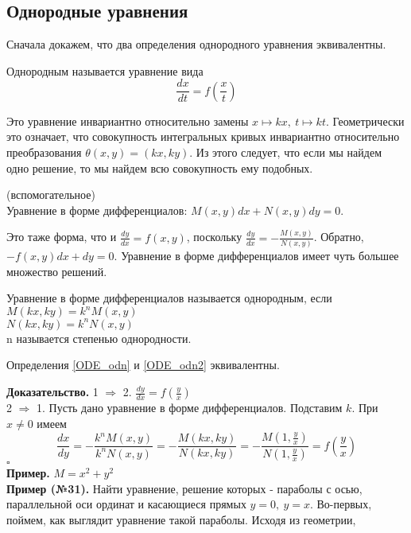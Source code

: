 \subsection{Однородные уравнения}
Сначала докажем, что два определения однородного уравнения эквивалентны.
\begin{defin}\label{ODE_odn}
Однородным называется уравнение вида
\begin{equation}%
    \frac{dx}{dt}=f\left(\frac{x}{t}\right) 
\end{equation} 
\end{defin}
Это уравнение инвариантно относительно замены $x\mapsto kx,~t\mapsto kt$.
Геометрически это означает, что совокупность интегральных кривых инвариантно
относительно преобразования $\theta(x,y)=(kx,ky)$.
Из этого следует, что если мы найдем одно решение, то мы найдем всю 
совокупность ему подобных. %
\begin{defin}
    (вспомогательное)\\
Уравнение в форме дифференциалов:
    $M(x,y)dx+N(x,y)dy=0$.  
\end{defin}
Это таже форма, что и $\frac{dy}{dx}=f(x,y)$, поскольку 
$\frac{dy}{dx}=-\frac{M(x,y)}{N(x,y)}$. Обратно, $-f(x,y)dx+dy=0$.
Уравнение в форме дифференциалов имеет чуть большее множество решений. 
\begin{defin}\label{ODE_odn2}
Уравнение в форме дифференциалов называется однородным, если\\
$M(kx,ky)=k^nM(x,y)$\\ 
$N(kx,ky)=k^nN(x,y)$\\
n называется степенью однородности.
\end{defin}
\begin{theor}
    Определения \ref{ODE_odn} и \ref{ODE_odn2} эквивалентны. 
\end{theor}
\textbf{Доказательство.} 1 $\Rightarrow$ 2. $\frac{dy}{dx}=f(\frac{y}{x})$\\
2 $\Rightarrow$ 1. Пусть дано уравнение в форме дифференциалов. Подставим $k$.
При $x\ne 0$ имеем 
$$\frac{dx}{dy}=-\frac{k^nM(x,y)}{k^nN(x,y)}=
-\frac{M(kx,ky)}{N(kx,ky)}=-\frac{M(1,\frac{y}{x})}{N(1,\frac{y}{x})}=
f\left( \frac{y}{x} \right) $$
$\square$ \\
\textbf{Пример.} $M=x^2+y^2$\\
\textbf{Пример (№31).} Найти уравнение, решение которых - параболы с осью, 
параллельной оси ординат и касающиеся прямых $y=0,~y=x$. 
Во-первых, поймем, как выглядит уравнение такой параболы. Исходя из геометрии,
